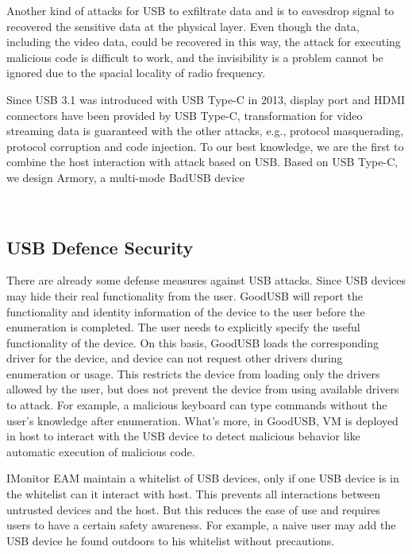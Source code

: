 Another kind of attacks for USB to exfiltrate data\cite{smartphone}\cite{poweremi} and \cite{usbdriver} is to eavesdrop signal to recovered the sensitive data at the physical layer. Even though the data, including the video data, could be recovered in this way, the attack for executing malicious code is difficult to work, and the invisibility is a problem cannot be ignored due to the spacial locality of radio frequency. 

Since USB 3.1 was introduced with USB Type-C in 2013, display port and HDMI connectors have been provided by USB Type-C, transformation for video streaming data is guaranteed with the other attacks, e.g., protocol masquerading,  protocol corruption and code injection. To our best knowledge, we are the first to combine the host interaction with attack based on USB. Based on USB Type-C, we design Armory, a multi-mode BadUSB device 


\\

\subsection{USB Defence Security}

There are already some defense measures against USB attacks. Since USB devices may hide their real functionality from the user. GoodUSB\cite{tian2015defending} will report the functionality and identity information of the device to the user before the enumeration is completed. The user needs to explicitly specify the useful functionality of the device. On this basis, GoodUSB loads the corresponding driver for the device, and device can not request other drivers during enumeration or usage. This restricts the device from loading only the drivers allowed by the user, but does not prevent the device from using available drivers to attack. For example, a malicious keyboard can type commands without the user's knowledge after enumeration. What's more, in GoodUSB, VM is deployed in host to interact with the USB device to detect malicious behavior like automatic execution of malicious code.
 
IMonitor EAM\cite{IMonitor} maintain a whitelist of USB devices, only if one USB device is in the whitelist can it interact with host. This prevents all interactions between untrusted devices and the host. But this reduces the ease of use and requires users to have a certain safety awareness. For example, a naive user may add the USB device he found outdoors to his whitelist without precautions.

